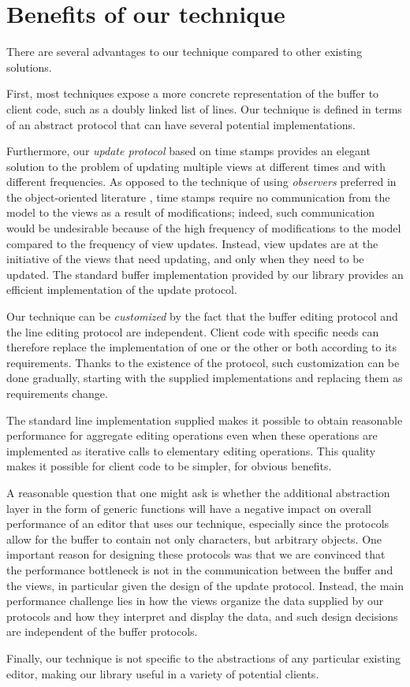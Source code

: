 \section{Benefits of our technique}
 
There are several advantages to our technique compared to other
existing solutions.

First, most techniques expose a more concrete representation of the
buffer to client code, such as a doubly linked list of lines.  Our
technique is defined in terms of an abstract \clos{} protocol that can
have several potential implementations.

Furthermore, our \emph{update protocol} based on time stamps provides
an elegant solution to the problem of updating multiple views at
different times and with different frequencies.  As opposed to the
technique of using \emph{observers} preferred in the object-oriented
literature \cite{Gamma:1998:DPC:551551}, time stamps require no
communication from the model to the views as a result of
modifications; indeed, such communication would be undesirable because
of the high frequency of modifications to the model compared to the
frequency of view updates.  Instead, view updates are at the
initiative of the views that need updating, and only when they need to
be updated.  The standard buffer implementation provided by our
library provides an efficient implementation of the update protocol.

Our technique can be \emph{customized} by the fact that the buffer
editing protocol and the line editing protocol are independent.
Client code with specific needs can therefore replace the
implementation of one or the other or both according to its
requirements.  Thanks to the existence of the \clos{} protocol, such
customization can be done gradually, starting with the supplied
implementations and replacing them as requirements change.

The standard line implementation supplied makes it possible to obtain
reasonable performance for aggregate editing operations even when
these operations are implemented as iterative calls to elementary
editing operations.  This quality makes it possible for client code to
be simpler, for obvious benefits.

A reasonable question that one might ask is whether the additional
abstraction layer in the form of generic functions will have a
negative impact on overall performance of an editor that uses our
technique, especially since the protocols allow for the buffer to
contain not only characters, but arbitrary objects.  One important
reason for designing these protocols was that we are convinced that
the performance bottleneck is not in the communication between the
buffer and the views, in particular given the design of the update
protocol.  Instead, the main performance challenge lies in how the
views organize the data supplied by our protocols and how they
interpret and display the data, and such design decisions are
independent of the buffer protocols.

Finally, our technique is not specific to the abstractions of any
particular existing editor, making our library useful in a variety of
potential clients.
